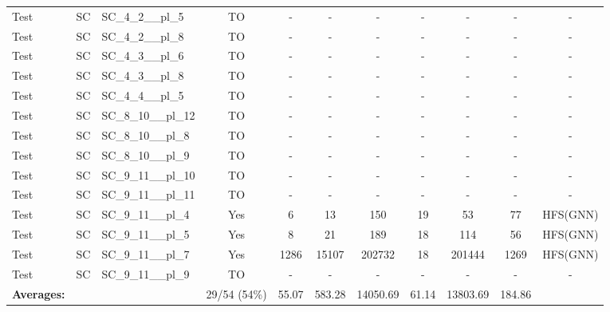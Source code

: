 \documentclass{article}
\begin{document}
\begin{tabular}{lllcccccccc}
Test & SC & SC\_4\_2\_\_pl\_5 & TO & - & - & - & - & - & - & - \\
Test & SC & SC\_4\_2\_\_pl\_8 & TO & - & - & - & - & - & - & - \\
Test & SC & SC\_4\_3\_\_pl\_6 & TO & - & - & - & - & - & - & - \\
Test & SC & SC\_4\_3\_\_pl\_8 & TO & - & - & - & - & - & - & - \\
Test & SC & SC\_4\_4\_\_pl\_5 & TO & - & - & - & - & - & - & - \\
Test & SC & SC\_8\_10\_\_pl\_12 & TO & - & - & - & - & - & - & - \\
Test & SC & SC\_8\_10\_\_pl\_8 & TO & - & - & - & - & - & - & - \\
Test & SC & SC\_8\_10\_\_pl\_9 & TO & - & - & - & - & - & - & - \\
Test & SC & SC\_9\_11\_\_pl\_10 & TO & - & - & - & - & - & - & - \\
Test & SC & SC\_9\_11\_\_pl\_11 & TO & - & - & - & - & - & - & - \\
Test & SC & SC\_9\_11\_\_pl\_4 & Yes & 6 & 13 & 150 & 19 & 53 & 77 & HFS(GNN) \\
Test & SC & SC\_9\_11\_\_pl\_5 & Yes & 8 & 21 & 189 & 18 & 114 & 56 & HFS(GNN) \\
Test & SC & SC\_9\_11\_\_pl\_7 & Yes & 1286 & 15107 & 202732 & 18 & 201444 & 1269 & HFS(GNN) \\
Test & SC & SC\_9\_11\_\_pl\_9 & TO & - & - & - & - & - & - & - \\
\textbf{Averages:} & & & 29/54 (54\%) & 55.07 & 583.28 & 14050.69 & 61.14 & 13803.69 & 184.86 & \\
\bottomrule
\end{tabular}
\newpage
\end{document}
